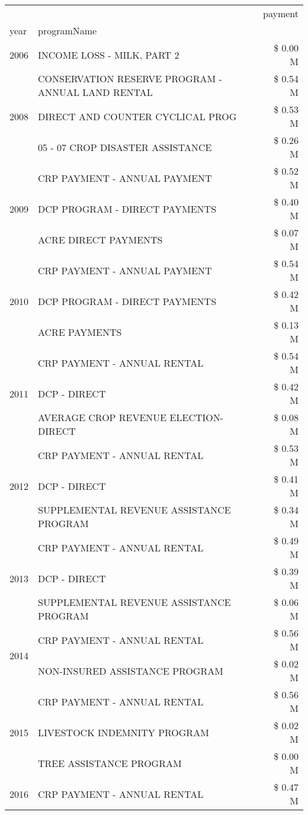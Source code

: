 \begin{tabular}{llr}
\toprule
 &  & payment \\
year & programName &  \\
\midrule
2006 & INCOME LOSS - MILK, PART 2 & \$ 0.00 M \\
\cline{1-3}
\multirow[t]{3}{*}{2008} & CONSERVATION RESERVE PROGRAM - ANNUAL LAND RENTAL & \$ 0.54 M \\
 & DIRECT AND COUNTER CYCLICAL PROG & \$ 0.53 M \\
 & 05 - 07 CROP DISASTER ASSISTANCE & \$ 0.26 M \\
\cline{1-3}
\multirow[t]{3}{*}{2009} & CRP PAYMENT - ANNUAL PAYMENT & \$ 0.52 M \\
 & DCP PROGRAM - DIRECT PAYMENTS & \$ 0.40 M \\
 & ACRE DIRECT PAYMENTS & \$ 0.07 M \\
\cline{1-3}
\multirow[t]{3}{*}{2010} & CRP PAYMENT - ANNUAL PAYMENT & \$ 0.54 M \\
 & DCP PROGRAM - DIRECT PAYMENTS & \$ 0.42 M \\
 & ACRE PAYMENTS & \$ 0.13 M \\
\cline{1-3}
\multirow[t]{3}{*}{2011} & CRP PAYMENT - ANNUAL RENTAL & \$ 0.54 M \\
 & DCP - DIRECT & \$ 0.42 M \\
 & AVERAGE CROP REVENUE ELECTION-DIRECT & \$ 0.08 M \\
\cline{1-3}
\multirow[t]{3}{*}{2012} & CRP PAYMENT - ANNUAL RENTAL & \$ 0.53 M \\
 & DCP - DIRECT & \$ 0.41 M \\
 & SUPPLEMENTAL REVENUE ASSISTANCE PROGRAM & \$ 0.34 M \\
\cline{1-3}
\multirow[t]{3}{*}{2013} & CRP PAYMENT - ANNUAL RENTAL & \$ 0.49 M \\
 & DCP - DIRECT & \$ 0.39 M \\
 & SUPPLEMENTAL REVENUE ASSISTANCE PROGRAM & \$ 0.06 M \\
\cline{1-3}
\multirow[t]{2}{*}{2014} & CRP PAYMENT - ANNUAL RENTAL & \$ 0.56 M \\
 & NON-INSURED ASSISTANCE PROGRAM & \$ 0.02 M \\
\cline{1-3}
\multirow[t]{3}{*}{2015} & CRP PAYMENT - ANNUAL RENTAL & \$ 0.56 M \\
 & LIVESTOCK INDEMNITY PROGRAM & \$ 0.02 M \\
 & TREE ASSISTANCE PROGRAM & \$ 0.00 M \\
\cline{1-3}
\multirow[t]{3}{*}{2016} & CRP PAYMENT - ANNUAL RENTAL & \$ 0.47 M \\

\end{tabular}

